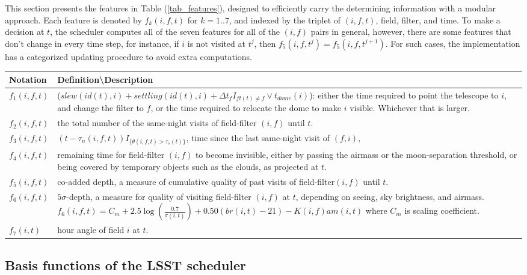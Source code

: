 \documentclass[12pt]{aastex62}
\theoremstyle{definition}
\begin{document}
This section presents the features in Table (\ref{tab_features}), designed to efficiently carry the determining information with a modular approach. Each feature is denoted by $f_k(i,f,t)$ for $k= 1..7$, and indexed by the triplet of $(i,f,t)$, field, filter, and time. To make a decision at $t$, the scheduler computes all of the seven features for all of the $(i,f)$ pairs in general, however, there are some features that don't change in every time step, for instance, if $i$ is not visited at $t^j$, then $f_5(i,f,t^j)= f_5(i,f,t^{j+1})$. For such cases, the implementation has a categorized updating procedure to avoid extra computations.


\begin{table}[h]
\begin{tabularx}{\textwidth}{| l | X |}
\hline
Notation & Definition\textbackslash Description\\ \hline \hline 
$f_1(i,f,t)$ & ($slew(id(t),i)+settling(id(t),i)+\Delta t_{f} I_{ft(t) \neq f} \vee t_{dome}(i)$): either the time required to point the telescope to $i$, and change the filter to $f$, or the time required to relocate the dome to make $i$ visible. Whichever that is larger.\\ \hline
$f_2(i,f,t)$ &  the total number of the same-night visits of field-filter $(i,f)$ until $t$.\\ \hline
$f_3(i,f,t)$ &  $(t - \tau_n(i,f,t)) I_{\{\theta(i,f,t) > \tau_s(t)\}}$, time since the last same-night visit of $(f,i),$\\ \hline
$f_4(i,f,t)$ &  remaining time for field-filter $(i,f)$ to become invisible, either by passing the airmass or the moon-separation threshold, or being covered by temporary objects such as the clouds, as projected at $t$.\\ \hline
$f_5(i,f,t)$ &  co-added depth, a measure of cumulative quality of past visits of field-filter$(i,f)$ until $t$.\\ \hline
$f_6(i,f,t)$ &  $5\sigma$-depth, a measure for quality of visiting field-filter $(i,f)$ at $t$, depending on seeing, sky brightness, and airmass. $f_6(i,f,t) = C_m + 2.5 \log (\frac{0.7}{\sigma(i,t)}) + 0.50 (br(i,t)-21) - K(i,f) am(i,t)$ where $C_m$ is scaling coefficient.\\ \hline
$f_7(i,t)$  & hour angle of field $i$ at $t$.\\ \hline
\hline
\end{tabularx}
\end{table}\label{tab_features}

\subsection{Basis functions of the LSST scheduler}\label{sec_lsst_bfs}
\end{document}
